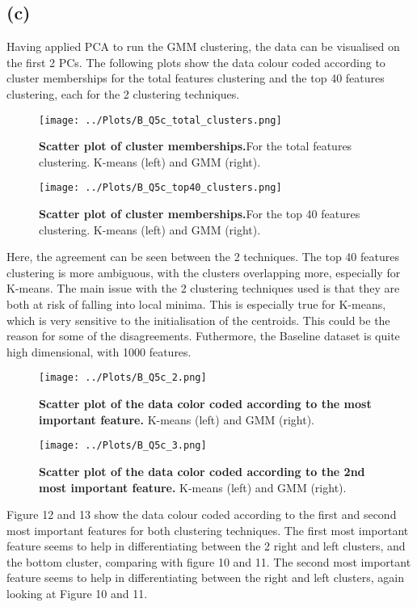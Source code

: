 \documentclass[12pt]{report} %
\begin{document}
\subsection*{(c)}

Having applied PCA to run the GMM clustering, the data can be visualised on the first 2 PCs. The following plots show the data colour coded according to cluster memberships for the total features clustering and the top 40 features clustering, each for the 2 clustering techniques.

\begin{figure}[htbp]
    \centering
    \texttt{[image: ../Plots/B\_Q5c\_total\_clusters.png]}
    \caption{\textbf{Scatter plot of cluster memberships.}For the total features clustering. K-means (left) and GMM (right).}
\end{figure}

\begin{figure}[htbp]
    \centering
    \texttt{[image: ../Plots/B\_Q5c\_top40\_clusters.png]}
    \caption{\textbf{Scatter plot of cluster memberships.}For the top 40 features clustering. K-means (left) and GMM (right).}
\end{figure}

Here, the agreement can be seen between the 2 techniques. The top 40 features clustering is more ambiguous, with the clusters overlapping more, especially for K-means. The main issue with the 2 clustering techniques used is that they are both at risk of falling into local minima. This is especially true for K-means, which is very sensitive to the initialisation of the centroids\cite[p. 263]{sklearn_book}. This could be the reason for some of the disagreements. Futhermore, the Baseline dataset is quite high dimensional, with 1000 features.  

\begin{figure}[htbp]
    \centering
    \texttt{[image: ../Plots/B\_Q5c\_2.png]}
    \caption{\textbf{Scatter plot of the data color coded according to the most important feature.} K-means (left) and GMM (right).}
\end{figure}


\begin{figure}[htbp]
    \centering
    \texttt{[image: ../Plots/B\_Q5c\_3.png]}
    \caption{\textbf{Scatter plot of the data color coded according to the 2nd most important feature.} K-means (left) and GMM (right).}
\end{figure}

Figure 12 and 13 show the data colour coded according to the first and second most important features for both clustering techniques. The first most important feature seems to help in differentiating between the 2 right and left clusters, and the bottom cluster, comparing with figure 10 and 11. The second most important feature seems to help in differentiating between the right and left clusters, again looking at Figure 10 and 11.




\end{document}
